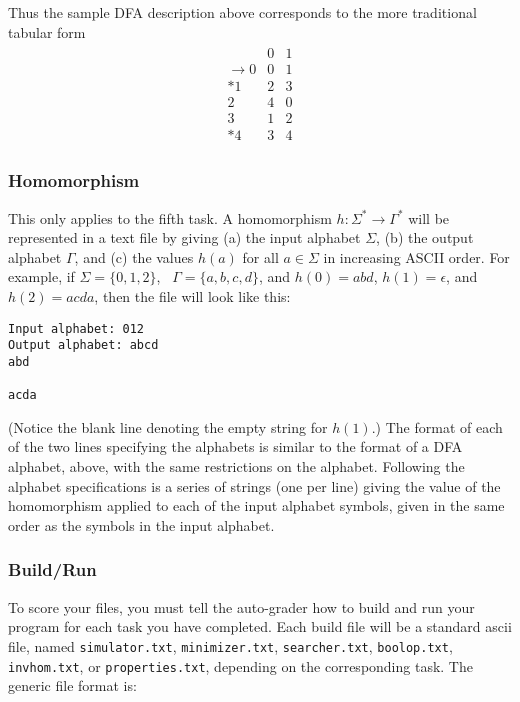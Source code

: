 \documentclass[11pt]{article}
\begin{document}
Thus the sample DFA description above corresponds to the more
traditional tabular form
\begin{align*}
  \begin{array}{r||cc}
    & 0 & 1 \\
    \hline\hline
    \rightarrow 0 & 0 & 1 \\
    {*}1 & 2 & 3 \\
    2 & 4 & 0 \\
    3 & 1 & 2 \\
    {*}4 & 3 & 4
  \end{array}
\end{align*}

\subsubsection{Homomorphism}\label{sec:hom-format}

This only applies to the fifth task.  A homomorphism
$h:\Sigma^*\rightarrow\Gamma^*$ will be represented in a text file by
giving (a) the input alphabet $\Sigma$, (b) the output alphabet
$\Gamma$, and (c) the values $h(a)$ for all $a\in\Sigma$ in increasing
ASCII order.  For example, if $\Sigma = \{0,1,2\}$, \ $\Gamma =
\{a,b,c,d\}$, and $h(0) = abd$, $h(1) = \epsilon$, and $h(2) = acda$,
then the file will look like this:
\begin{verbatim}
Input alphabet: 012
Output alphabet: abcd
abd

acda
\end{verbatim}
(Notice the blank line denoting the empty string for $h(1)$.)  The
format of each of the two lines specifying the alphabets is similar to
the format of a DFA alphabet, above, with the same restrictions on the
alphabet.  Following the alphabet specifications is a series of
strings (one per line) giving the value of the homomorphism applied to
each of the input alphabet symbols, given in the same order as the
symbols in the input alphabet.

\subsubsection{Build/Run}\label{sec:build-format}

To score your files, you must tell the auto-grader how to build and
run your program for each task you have completed. Each build file
will be a standard ascii file, named \texttt{simulator.txt},
\texttt{minimizer.txt}, \texttt{searcher.txt}, \texttt{boolop.txt},
\texttt{invhom.txt}, or \texttt{properties.txt}, depending on the
corresponding task. The generic file format is:
\end{document}
